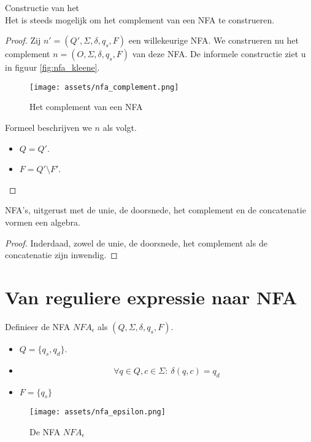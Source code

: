 \documentclass[main.tex]{subfiles}
\begin{document}
\begin{st}
  Constructie van het \\
  Het is steeds mogelijk om het complement van een NFA te construeren.

  \begin{proof}
    Zij $n' = (Q',\Sigma,\delta,q_{s},F)$ een willekeurige NFA. We construeren nu het complement $n = (O,\Sigma,\delta,q_{s},F)$ van deze NFA.
    De informele constructie ziet u in figuur \ref{fig:nfa_kleene}.
    \begin{figure}[H]
      \centering
      \texttt{[image: assets/nfa\_complement.png]}      
      \caption{Het complement van een NFA}
      \label{fig:nfa_complement}
    \end{figure}
    Formeel beschrijven we $n$ als volgt.
    \begin{itemize}
    \item $Q = Q'$.
    \item $F = Q'\setminus F'$.
    \end{itemize}
  \end{proof}
\end{st}

\begin{ei}
  NFA's, uitgerust met de unie, de doorsnede, het complement en de concatenatie vormen een algebra.
  \begin{proof}
    Inderdaad, zowel de unie, de doorsnede, het complement als de concatenatie zijn inwendig.
  \end{proof}
\end{ei}

\section{Van reguliere expressie naar NFA}
\label{sec:van-reguliere-expressie-naar-nfa}

\begin{de}
  Definieer de NFA $NFA_{\epsilon}$ als $(Q, \Sigma, \delta, q_{s}, F)$.

  \begin{itemize}
  \item $Q = \{q_{s},q_{d}\}$.
  \item 
    \[ \forall q \in Q, c \in \Sigma:\ \delta(q,c) = q_{d} \]
  \item $F = \{q_{s}\}$
  \end{itemize}

  \begin{figure}[H]
    \centering
    \texttt{[image: assets/nfa\_epsilon.png]}      
    \caption{De NFA $NFA_{\epsilon}$}
    \label{fig:nfa_epsilon}
  \end{figure}
\end{de}
\end{document}
